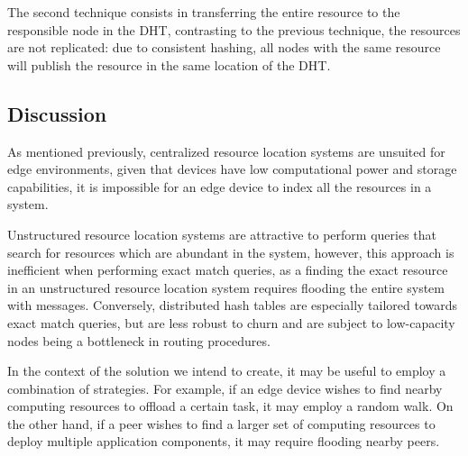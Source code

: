 The second technique consists in transferring the entire resource to the responsible node in the DHT, contrasting to the previous technique, the resources are not replicated: due to consistent hashing, all nodes with the same resource will publish the resource in the same location of the DHT. 

\subsection{Discussion}

As mentioned previously, centralized resource location systems are unsuited for edge environments, given that devices have low computational power and storage capabilities, it is impossible for an edge device to index all the resources in a system.

Unstructured resource location systems are attractive to perform queries that search for resources which are abundant in the system, however, this approach is inefficient when performing exact match queries, as a finding the exact resource in an unstructured resource location system requires flooding the entire system with messages. Conversely, distributed hash tables are especially tailored towards exact match queries, but are less robust to churn and are subject to low-capacity nodes being a bottleneck in routing procedures. 

In the context of the solution we intend to create, it may be useful to employ a combination of strategies. For example, if an edge device wishes to find nearby computing resources to offload a certain task, it may employ a random walk. On the other hand, if a peer wishes to find a larger set of computing resources to deploy multiple application components, it may require flooding nearby peers. 






